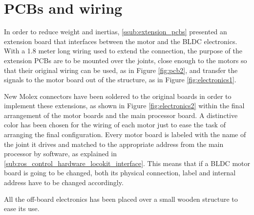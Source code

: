 \section{PCBs and wiring} %
\label{sec:pcbs_and_wiring}
In order to reduce weight and inertias, \ref{ssub:extension_pcbs} presented an extension board that interfaces between the motor and the BLDC electronics.
With a 1.8 meter long wiring used to extend the connection, the purpose of the extension PCBs are to be mounted over the joints, close enough to the motors so that their original wiring can be used, as in Figure \ref{fig:pcb2}, and transfer the signals to the motor board out of the structure, as in Figure \ref{fig:electronics1}.

New Molex connectors have been soldered to the original boards in order to implement these extensions, as shown in Figure \ref{fig:electronics2} within the final arrangement of the motor boards and the main processor board.
A distinctive color has been chosen for the wiring of each motor just to ease the task of arranging the final configuration.
Every motor board is labeled with the name of the joint it drives and matched to the appropriate address from the main processor by software, as explained in \ref{sub:ros_control_hardware_locokit_interface}.
This means that if a BLDC motor board is going to be changed, both its physical connection, label and internal address have to be changed accordingly.

All the off-board electronics has been placed over a small wooden structure to ease its use.

